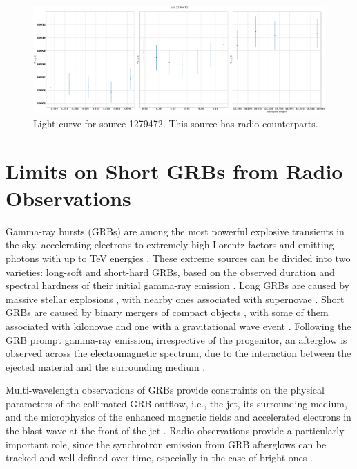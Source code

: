 \documentclass[12pt]{article}
\begin{document}
\begin{figure}
	\includegraphics[width=\textwidth]{src1279472multi.png}
	\caption{Light curve for source 1279472. This source has radio counterparts.}
	\label{fig:src1279472multi}
\end{figure}

\section{Limits on Short GRBs from Radio Observations}

Gamma-ray bursts (GRBs) are among the most powerful explosive transients in the sky, accelerating electrons to extremely high Lorentz factors and emitting photons with up to TeV energies \citep[e.g.,][]{2019Natur.575..464A,2019Natur.575..459M}. These extreme sources can be divided into two varieties: long-soft and short-hard GRBs, based on the observed duration and spectral hardness of their initial gamma-ray emission \citep{1993ApJ...413L.101K}. Long GRBs are caused by massive stellar explosions \citep{1993ApJ...405..273W}, with nearby ones associated with supernovae \citep[e.g.,][]{2003Natur.423..847H}. Short GRBs are caused by binary mergers of compact objects \citep{1989Natur.340..126E}, with some of them associated with kilonovae \citep[e.g.,][]{2013Natur.500..547T} and one with a gravitational wave event \citep{2017ApJ...848L..12A}. Following the GRB prompt gamma-ray emission, irrespective of the progenitor, an afterglow is observed across the electromagnetic spectrum, due to the interaction between the ejected material and the surrounding medium \citep{1998ApJ...497L..17S,1999ApJ...523..177W,1999ApJ...520L..29C}.

Multi-wavelength observations of GRBs provide constraints on the physical parameters of the collimated GRB outflow, i.e., the jet, its surrounding medium, and the microphysics of the enhanced magnetic fields and accelerated electrons in the blast wave at the front of the jet \citep{1998ApJ...497L..17S}. Radio observations provide a particularly important role, since the synchrotron emission from GRB afterglows can be tracked and well defined over time, especially in the case of bright ones \citep[see, e.g.,][for a review]{2014PASA...31....8G}.
\end{document}
